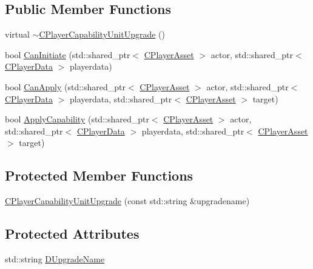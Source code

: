 \subsection*{Public Member Functions}
\begin{DoxyCompactItemize}
\item 
virtual \hyperlink{classCPlayerCapabilityUnitUpgrade_a7784e1fb92a26acb700c06ab38d2733b}{$\sim$\+C\+Player\+Capability\+Unit\+Upgrade} ()
\item 
bool \hyperlink{classCPlayerCapabilityUnitUpgrade_ad01fc5df598efea4063ac2bbf0ba34e9}{Can\+Initiate} (std\+::shared\+\_\+ptr$<$ \hyperlink{classCPlayerAsset}{C\+Player\+Asset} $>$ actor, std\+::shared\+\_\+ptr$<$ \hyperlink{classCPlayerData}{C\+Player\+Data} $>$ playerdata)
\item 
bool \hyperlink{classCPlayerCapabilityUnitUpgrade_a93d1a57f2cc52b90ce6cb714717bfefd}{Can\+Apply} (std\+::shared\+\_\+ptr$<$ \hyperlink{classCPlayerAsset}{C\+Player\+Asset} $>$ actor, std\+::shared\+\_\+ptr$<$ \hyperlink{classCPlayerData}{C\+Player\+Data} $>$ playerdata, std\+::shared\+\_\+ptr$<$ \hyperlink{classCPlayerAsset}{C\+Player\+Asset} $>$ target)
\item 
bool \hyperlink{classCPlayerCapabilityUnitUpgrade_a8cc6fee17dd178fd798e36c3d5301e9d}{Apply\+Capability} (std\+::shared\+\_\+ptr$<$ \hyperlink{classCPlayerAsset}{C\+Player\+Asset} $>$ actor, std\+::shared\+\_\+ptr$<$ \hyperlink{classCPlayerData}{C\+Player\+Data} $>$ playerdata, std\+::shared\+\_\+ptr$<$ \hyperlink{classCPlayerAsset}{C\+Player\+Asset} $>$ target)
\end{DoxyCompactItemize}
\subsection*{Protected Member Functions}
\begin{DoxyCompactItemize}
\item 
\hyperlink{classCPlayerCapabilityUnitUpgrade_ac87129322f9f31cc271ee3de33502c56}{C\+Player\+Capability\+Unit\+Upgrade} (const std\+::string \&upgradename)
\end{DoxyCompactItemize}
\subsection*{Protected Attributes}
\begin{DoxyCompactItemize}
\item 
std\+::string \hyperlink{classCPlayerCapabilityUnitUpgrade_a5de8bffd6935c699f431329ad4ee5eec}{D\+Upgrade\+Name}
\end{DoxyCompactItemize}
